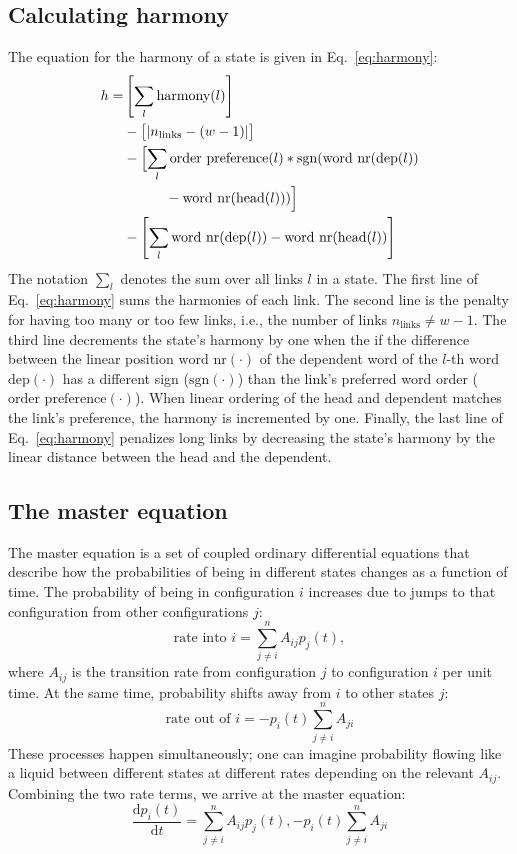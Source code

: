 \documentclass[a4paper, 12pt]{article}
\newcommand{\ddt}[1]{\frac{\mathrm{d}{#1}}{\mathrm{d}t}}
\begin{document}
\subsection{Calculating harmony}
The equation for the harmony of a state is
given in Eq.~\ref{eq:harmony}:
\begin{equation}
\begin{split}\label{eq:harmony}
    h = &\left[\sum_l \text{harmony}(l)\right] \\
    & - \bigl[|n_{\text{links}} - (w - 1)|\bigr] \\
    & - \Bigl[\sum_l \text{order preference}(l) * \text{sgn}(\text{word nr}(\text{dep}(l)) \\
    & \quad\quad\quad - \text{word nr}(\text{head}(l)))\Bigr] \\
    & - \left[\sum_l \text{word nr}(\text{dep}(l)) - \text{word nr}(\text{head}(l))\right]
\end{split}
\end{equation}
The notation $\sum_l$ denotes the sum over all links $l$ in a state. The first
line of Eq.~\ref{eq:harmony} sums the harmonies of each link. The second line is
the penalty for having too many or too few links, i.e., the number of links
$n_{\text{links}} \neq w - 1$. The third line decrements the state's harmony by
one when the if the difference between the linear position $\text{word
    nr}(\cdot)$ of the dependent word of the $l$-th word $\text{dep}(\cdot)$
has a different sign ($\text{sgn}(\cdot)$) than the link's preferred word order
($\text{order preference}(\cdot)$). When linear ordering of the head and
dependent matches the link's preference, the harmony is incremented by one.
Finally, the last line of Eq.~\ref{eq:harmony} penalizes long links by decreasing
the state's harmony by the linear distance between the head and the dependent.

\subsection{The master equation}
The master equation is a set of coupled ordinary differential equations that
describe how the probabilities of being in different states changes as a
function of time. The probability of being in configuration $i$ increases due
to jumps to that configuration from other configurations $j$:
\[
    \text{rate into } i = \sum_{j\neq i}^n A_{ij} p_j(t),
\]
where $A_{ij}$ is the transition rate from configuration $j$ to configuration
$i$ per unit time. At the same time, probability shifts away from $i$ to other states $j$:
\[
    \text{rate out of } i = -p_i(t) \sum_{j\neq i}^n A_{ji}
\]
These processes happen simultaneously; one can imagine probability flowing like
a liquid between different states at different rates depending on the relevant
$A_{ij}$. Combining the two rate terms, we arrive at the master equation:
\begin{equation}\label{eq:me-components}
    \ddt{p_i(t)} = \sum_{j\neq i}^n A_{ij} p_j(t), - p_i(t) \sum_{j\neq i}^n
    A_{ji}
\end{equation}
\end{document}

